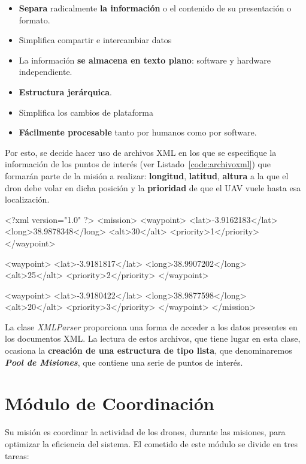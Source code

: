 \begin{itemize}
\item \textbf{Separa} radicalmente \textbf{la información} o el contenido de su presentación o formato.
\item Simplifica compartir e intercambiar datos
\item La información \textbf{se almacena en texto plano}: software y hardware independiente.
\item \textbf{Estructura jerárquica}.
\item Simplifica los cambios de plataforma
\item \textbf{Fácilmente procesable} tanto por humanos como por software.
\end{itemize}

Por esto, se decide hacer uso de archivos XML en los que se especifique la información de los puntos de interés (ver Listado~\ref{code:archivoxml}) que formarán parte de la misión a realizar: \textbf{longitud}, \textbf{latitud}, \textbf{altura} a la que el dron debe volar en dicha posición y la \textbf{prioridad} de que el \acs{UAV} vuele hasta esa localización. 

\begin{listing}[
 float=,
 language = XML,
 caption = {Ejemplo de archivo XML que contiene la información de los «waypoints»},
 label  = code:archivoxml]
<?xml version="1.0" ?>
<mission>
	<waypoint>
 		<lat>-3.9162183</lat>
 		<long>38.9878348</long>
		<alt>30</alt>
		<priority>1</priority>
	</waypoint>

	<waypoint>
 		<lat>-3.9181817</lat>
 		<long>38.9907202</long>
		<alt>25</alt>
		<priority>2</priority>
	</waypoint>

	<waypoint>
 		<lat>-3.9180422</lat>
 		<long>38.9877598</long>
		<alt>20</alt>
		<priority>3</priority>
	</waypoint>
</mission>
\end{listing}

La clase \textit{XMLParser} proporciona una forma de acceder a los datos presentes en los documentos XML. La lectura de estos archivos, que tiene lugar en esta clase, ocasiona la \textbf{creación de una estructura de tipo lista}, que denominaremos \textbf{\textit{Pool de Misiones}}, que contiene una serie de puntos de interés.

\section{Módulo de Coordinación}

Su misión es coordinar la actividad de los drones, durante las misiones, para optimizar la eficiencia del sistema. El cometido de este módulo se divide en tres tareas:

